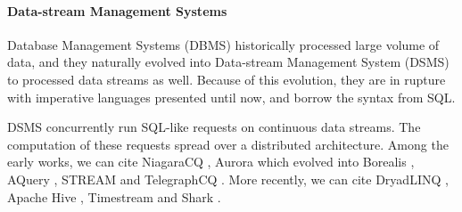 



\paragraph{Data-stream Management Systems}


Database Management Systems (DBMS) historically processed large volume of data, and they naturally evolved into Data-stream Management System (DSMS) to processed data streams as well.
Because of this evolution, they are in rupture with imperative languages presented until now, and borrow the syntax from SQL.

DSMS concurrently run SQL-like requests on continuous data streams.
The computation of these requests spread over a distributed architecture.
Among the early works, we can cite
NiagaraCQ \cite{Chen2000,Naughton2001},
Aurora \cite{Abadi2003,Abadi2003a,Balakrishnan2004} which evolved into
Borealis \cite{Abadi2005},
AQuery \cite{Lerner2003},
STREAM \cite{Arasu2003,Arasu2005} and
TelegraphCQ \cite{Krishnamurthy2003,Chandrasekaran2003}.
More recently, we can cite
DryadLINQ \cite{Isard2007,Yu2009},
Apache Hive \cite{Thusoo2009},
Timestream \cite{Qian2013} and
Shark \cite{Xin2013}.


